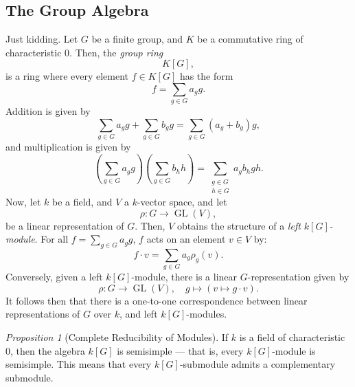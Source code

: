 \documentclass[a4paper]{report}
\theoremstyle{definition}
\theoremstyle{remark}
\theoremstyle{proposition}
\newtheorem{proposition}{Proposition}
\theoremstyle{conjecture}
\theoremstyle{lemma}
\theoremstyle{corollary}
\theoremstyle{exercise}
\theoremstyle{example}
\newcommand{\on}{\operatorname}
\begin{document}
\subsection{The Group Algebra}
Just kidding. Let $G$ be a finite group, and $K$ be a commutative 
ring of characteristic $0$. Then, the \emph{group ring} $$K[G],$$
is a ring where every element $f\in K[G]$ has the form
$$f = \sum_{g\in G} a_g g.$$
Addition is given by 
$$\sum_{g\in G}a_g g + \sum_{g\in G} b_g g = \sum_{g\in G}(a_g+b_g)g,$$
and multiplication is given by 
$$\left(\sum_{g\in G} a_gg \right)\left(\sum_{g \in G} b_hh\right) = \sum_{\substack{g\in G\\h\in G}} a_gb_h gh.$$
Now, let $k$ be a field, and $V$ a $k$-vector space, and let 
$$\rho : G \longrightarrow \on{GL}(V),$$ be 
a linear representation of $G$. Then, $V$ obtains the 
structure of a \emph{left $k[G]$-module}.
For all $f = \sum_{g\in G}a_gg$, $f$ acts on an element $v\in V$ by:
$$f\cdot v = \sum_{g\in G}a_g\rho_g(v).$$
Conversely, given a left $k[G]$-module, there is a linear $G$-representation
given by 
$$\rho : G\longrightarrow \on{GL}(V),\quad g \longmapsto(v\longmapsto g\cdot v).$$
It follows then that there is a one-to-one correspondence between
linear representations of $G$ over $k$, and left $k[G]$-modules.
\begin{proposition}[Complete Reducibility of Modules]
    If $k$ is a field of characteristic $0$, then the algebra 
    $k[G]$ is semisimple --- that is, every $k[G]$-module is semisimple.
    This means that every $k[G]$-submodule admits a complementary submodule.
\end{proposition}
\end{document}
